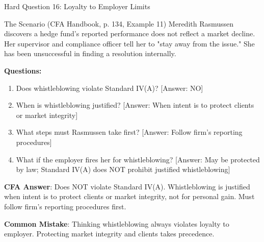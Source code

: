 \documentclass{beamer}
\begin{document}
	\begin{frame}{Hard Question 16: Loyalty to Employer Limits}
		\begin{block}{The Scenario (CFA Handbook, p. 134, Example 11)}
			Meredith Rasmussen discovers a hedge fund's reported performance does not reflect a market decline. Her supervisor and compliance officer tell her to "stay away from the issue." She has been unsuccessful in finding a resolution internally.
		\end{block}
		
		\vspace{0.2cm}
		\textbf{Questions:}
		\begin{enumerate}
			\item Does whistleblowing violate Standard IV(A)? \textcolor{cfared}{[Answer: NO]}
			\item When is whistleblowing justified? \textcolor{cfared}{[Answer: When intent is to protect clients or market integrity]}
			\item What steps must Rasmussen take first? \textcolor{cfared}{[Answer: Follow firm's reporting procedures]}
			\item What if the employer fires her for whistleblowing? \textcolor{cfared}{[Answer: May be protected by law; Standard IV(A) does NOT prohibit justified whistleblowing]}
		\end{enumerate}
		
		\vspace{0.2cm}
		\textcolor{cfablue}{\textbf{CFA Answer}}: Does NOT violate Standard IV(A). Whistleblowing is justified when intent is to protect clients or market integrity, not for personal gain. Must follow firm's reporting procedures first.
		
		\vspace{0.1cm}
		\textcolor{cfared}{\textbf{Common Mistake}}: Thinking whistleblowing always violates loyalty to employer. Protecting market integrity and clients takes precedence.
	\end{frame}
	
\end{document}
